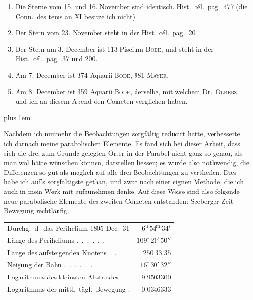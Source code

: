 \begin{enumerate}
\item[1)] Die Sterne vom 15. und 16. November sind identisch. Hist.\ cél.\ pag.\ 477 (die Conn.\ des tems an
XI besitze ich nicht).
\item[2)] Der Stern vom 23. November steht in der Hist.\ cél.\ pag.\ 20.
\item[3)] Der Stern am 3. December ist 113 Piscium \textsc{Bode}, und steht in der Hist.\ cél.\ pag.\ 37 und 200.
\item[4)] Am 7. December ist 374 Aquarii \textsc{Bode}, 981 \textsc{Mayer}.
\item[5)] Am 8. December ist 359 Aquarii \textsc{Bode}, derselbe, mit welchem Dr.\ \textsc{Olbers} und ich an diesem Abend
den Cometen verglichen haben.
\end{enumerate}

{\rightskip=0pt plus 1em
\par\indent Nachdem ich nunmehr die Beobachtungen sorgfältig reducirt hatte, verbesserte ich darnach meine
parabolischen Elemente. Es fand sich bei dieser Arbeit, dass sich die drei zum Grunde gelegten Örter
in der Parabel nicht ganz so genau, als man wol hätte wünschen können, darstellen liessen; es wurde
also nothwendig, die Differenzen so gut als möglich auf alle drei Beobachtungen zu vertheilen. Dies
habe ich auf's sorgfältigste gethan, und zwar nach einer eignen Methode, die ich auch in mein Werk
mit aufzunehmen denke. Auf diese Weise sind also folgende neue parabolische Elemente des zweiten
Cometen entstanden: Seeberger Zeit. Bewegung rechtläufig.\par}



\begin{center}\begingroup
\fontsize{9}{11}\selectfont
\setlength{\tabcolsep}{2pt}\renewcommand{\arraystretch}{1.12}
\begin{tabular}{lr}
Durchg.\ d.\ das Perihelium 1805 Dec.\ 31 & $6^{\mathrm{u}}\,54^{\mathrm{m}}\,34^{\mathrm{s}}$ \\
Länge des Periheliums .\ .\ .\ .\ .\ . & $109^{\circ}\,21'\,50''$ \\
Länge des aufsteigenden Knotens .\ . & $250\;33\;35$ \\
Neigung der Bahn .\ .\ .\ .\ .\ .\ . & $16^{\circ}\,30'\,32''$ \\
Logarithmus des kleinsten Abstandes .\ . & 9.9503300 \\
Logarithmus der mittl.\ tägl.\ Bewegung . & 0.0346333 \\
\end{tabular}\endgroup\end{center}



